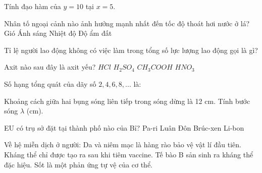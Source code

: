 \begin{ex}
    Tính đạo hàm của $y = 10$ tại $x=5$.
\end{ex}

\begin{ex}
    Nhân tố ngoại cảnh nào ảnh hưởng mạnh nhất đến tốc độ thoát hơi nước ở lá?
    \choice
    {Gió}
    {\True Ánh sáng}
    {Nhiệt độ}
    {Độ ẩm đất}
\end{ex}

\begin{ex}
    Tỉ lệ người lao động không có việc làm trong tổng số lực lượng lao động gọi là gì?
\end{ex}

\begin{ex}
    Axit nào sau đây là axit yếu?
    \choice
    {$HCl$}
    {$H_2SO_4$}
    {\True $CH_3COOH$}
    {$HNO_3$}
\end{ex}

\begin{ex}
    Số hạng tổng quát của dãy số $2, 4, 6, 8, ...$ là:
\end{ex}

\begin{ex}
    Khoảng cách giữa hai bụng sóng liên tiếp trong sóng dừng là 12 cm. Tính bước sóng $\lambda$ (cm).
\end{ex}

\begin{ex}
    EU có trụ sở đặt tại thành phố nào của Bỉ?
    \choice
    {Pa-ri}
    {Luân Đôn}
    {\True Brúc-xen}
    {Li-bon}
\end{ex}

\begin{ex}
    Về hệ miễn dịch ở người:
    \choiceTF
    {\True Da và niêm mạc là hàng rào bảo vệ vật lí đầu tiên.}
    {Kháng thể chỉ được tạo ra sau khi tiêm vaccine.}
    {\True Tế bào B sản sinh ra kháng thể đặc hiệu.}
    {\True Sốt là một phản ứng tự vệ của cơ thể.}
\end{ex}

